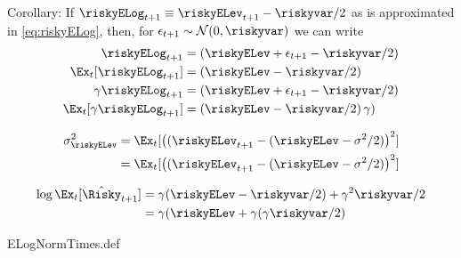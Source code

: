 \message{ !name(MathFactsList.tex)}\documentclass{handout}
\begin{document}
    Corollary: If $\riskyELog_{t+1} \equiv \riskyELev_{t+1} - \riskyvar/2$ as is approximated in \eqref{eq:riskyELog}, then, for $\epsilon_{t+1} \sim \mathcal{N}(0,\riskyvar)$ we can write
\begin{equation}\begin{gathered}\begin{aligned}
      \riskyELog_{t+1} & = (\riskyELev+\epsilon_{t+1} - \riskyvar/2)
      \\      \Ex_{t}[\riskyELog_{t+1}] & = (\riskyELev- \riskyvar/2)
      
      \\      \gamma      \riskyELog_{t+1} & = \left(\riskyELev+\epsilon_{t+1} - \riskyvar/2\right)
        \\     \Ex_{t}[ \gamma      \riskyELog_{t+1}] & = \left(\riskyELev - \riskyvar/2\right)\gamma)
\end{aligned}\end{gathered}\end{equation}
      
\begin{equation}\begin{gathered}\begin{aligned}
      \sigma^{2}_{\riskyELev} & = \Ex_{t}[\left((\riskyELev_{t+1} - (\riskyELev-\sigma^{2}/2)\right)^{2}]
      \\ & = \Ex_{t}[\left((\riskyELev_{t+1} - (\riskyELev-\sigma^{2}/2)\right)^{2}]
\end{aligned}\end{gathered}\end{equation}

\begin{equation}\begin{gathered}\begin{aligned}
  \log \Ex_{t}[\hat{\Risky}_{t+1}] & = {\gamma (\riskyELev-\riskyvar/2)+\gamma^{2}\riskyvar/2}
  \\ & = {\gamma (\riskyELev + \gamma (\gamma  \riskyvar/2)}
\end{aligned}\end{gathered}\end{equation}

\begin{verbatimwrite}{ELogNormTimes.def}
\providecommand{\ELogNormTimes}{\href{https://www.econ2.jhu.edu/people/ccarroll/public/LectureNotes/MathFacts/MathFactsList\#ELogNormTimes}{\ensuremath{\mathtt{[ELogNormTimes]}}}}
\end{verbatimwrite}
\end{document}
